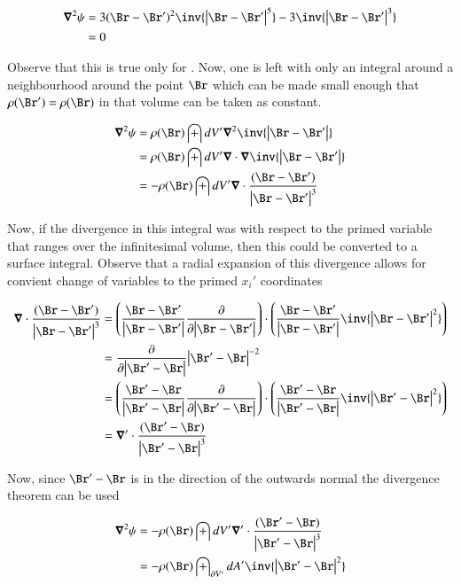 \documentclass{article}
\begin{document}
\begin{align*}
\spacegrad^2 \psi &= 
3 (\Br - \Br')^2 \inv{ \Abs{\Br - \Br'}^5} 
- 3 \inv{ \Abs{\Br - \Br'}^3} \\
&= 0 
\end{align*}

Observe that this is true only for .  Now, one is left with only an integral around a neighbourhood around the point $\Br$ which can be made small enough that $\rho(\Br') = \rho(\Br)$ in that volume can be taken as constant.

\begin{align*}
\spacegrad^2 \psi 
&= \rho(\Br) \int dV' \spacegrad^2 \inv{\Abs{\Br - \Br'}} \\
&= \rho(\Br) \int dV' \spacegrad \cdot \spacegrad \inv{\Abs{\Br - \Br'}} \\
&= -\rho(\Br) \int dV' \spacegrad \cdot \frac{(\Br -\Br')}{\Abs{\Br - \Br'}^3} \\
\end{align*}

Now, if the divergence in this integral was with respect to the primed variable that ranges over the infinitesimal volume, then this could be converted to a surface integral.  
Observe that a radial expansion of this divergence allows for convient change of variables to the primed $x_i'$ coordinates

\begin{align*}
\spacegrad \cdot \frac{(\Br -\Br')}{\Abs{\Br - \Br'}^3}
&= 
\left(\frac{\Br - \Br'}{\Abs{\Br-\Br'}} \PD{\Abs{\Br-\Br'}}{}\right) \cdot
\left(\frac{\Br - \Br'}{\Abs{\Br-\Br'}} \inv{\Abs{\Br-\Br'}^2}\right) \\
&= 
\PD{\Abs{\Br'-\Br}}{} {\Abs{\Br'-\Br}^{-2}} \\
&= 
\left(\frac{\Br' - \Br}{\Abs{\Br'-\Br}} \PD{\Abs{\Br'-\Br}}{}\right) \cdot
\left(\frac{\Br' - \Br}{\Abs{\Br'-\Br}} \inv{\Abs{\Br'-\Br}^2}\right) \\
&= \spacegrad' \cdot \frac{(\Br'-\Br)}{\Abs{\Br' - \Br}^3}
\end{align*}

Now, since $\Br'-\Br$ is in the direction of the outwards normal the divergence theorem can be used

\begin{align*}
\spacegrad^2 \psi 
&= -\rho(\Br) \int dV' \spacegrad' \cdot \frac{(\Br' -\Br)}{\Abs{\Br' - \Br}^3} \\
&= -\rho(\Br) \int_{\partial V'} dA' \inv{\Abs{\Br' - \Br}^2} \\
\end{align*}
\end{document}

